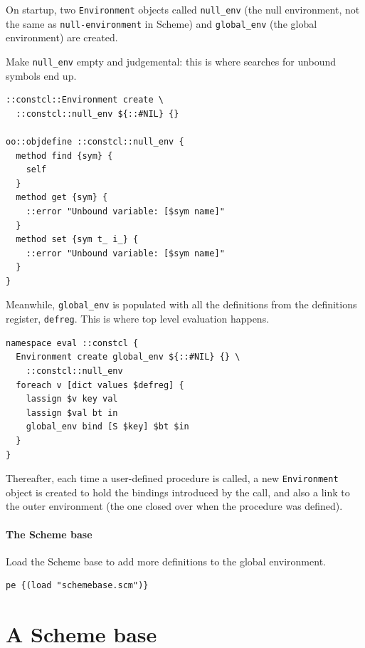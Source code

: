 \documentclass[twoside]{report}
\begin{document}
On startup, two \texttt{Environment} objects called \texttt{null\_env} (the null environment, not the same as \texttt{null-environment} in Scheme) and \texttt{global\_env} (the global environment) are created.

Make \texttt{null\_env} empty and judgemental: this is where searches for unbound symbols end up.

\begin{lstlisting}
::constcl::Environment create \
  ::constcl::null_env ${::#NIL} {}

oo::objdefine ::constcl::null_env {
  method find {sym} {
    self
  }
  method get {sym} {
    ::error "Unbound variable: [$sym name]"
  }
  method set {sym t_ i_} {
    ::error "Unbound variable: [$sym name]"
  }
}
\end{lstlisting}

Meanwhile, \texttt{global\_env} is populated with all the definitions from the definitions register, \texttt{defreg}. This is where top level evaluation happens.
\index{global\_env environment}

\begin{lstlisting}
namespace eval ::constcl {
  Environment create global_env ${::#NIL} {} \
    ::constcl::null_env
  foreach v [dict values $defreg] {
    lassign $v key val
    lassign $val bt in
    global_env bind [S $key] $bt $in
  }
}
\end{lstlisting}

Thereafter, each time a user-defined procedure is called, a new \texttt{Environment} object is created to hold the bindings introduced by the call, and also a link to the outer environment (the one closed over when the procedure was defined).

\subsubsection{The Scheme base}
\label{the-scheme-base}

Load the Scheme base to add more definitions to the global environment.

\begin{lstlisting}
pe {(load "schemebase.scm")}
\end{lstlisting}

\chapter{A Scheme base}
\label{a-scheme-base}
\end{document}
